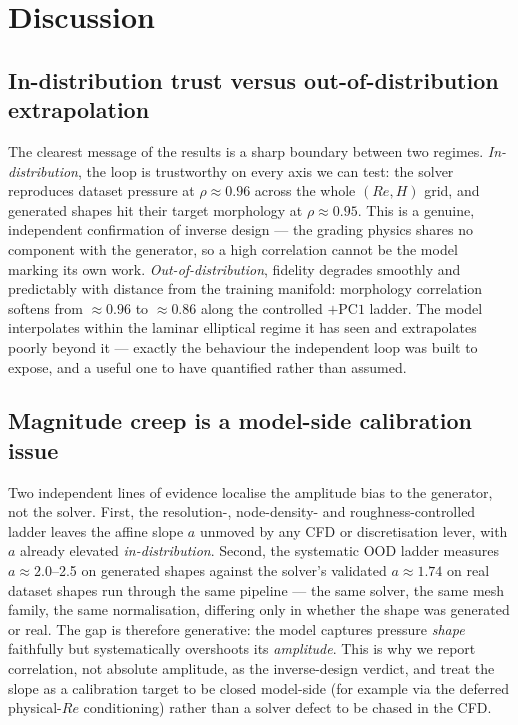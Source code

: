 \section{Discussion}

\subsection{In-distribution trust versus out-of-distribution extrapolation}

The clearest message of the results is a sharp boundary between two regimes. \emph{In-distribution},
the loop is trustworthy on every axis we can test: the solver reproduces dataset pressure at
$\rho \approx 0.96$ across the whole $(Re, H)$ grid, and generated shapes hit their target morphology
at $\rho \approx 0.95$. This is a genuine, independent confirmation of inverse design --- the grading
physics shares no component with the generator, so a high correlation cannot be the model marking its
own work. \emph{Out-of-distribution}, fidelity degrades smoothly and predictably with distance from
the training manifold: morphology correlation softens from $\approx 0.96$ to $\approx 0.86$ along the
controlled $+\mathrm{PC1}$ ladder. The model interpolates within the laminar elliptical regime it has
seen and extrapolates poorly beyond it --- exactly the behaviour the independent loop was built to
expose, and a useful one to have quantified rather than assumed.

\subsection{Magnitude creep is a model-side calibration issue}

Two independent lines of evidence localise the amplitude bias to the generator, not the solver. First,
the resolution-, node-density- and roughness-controlled ladder leaves the affine slope $a$ unmoved by
any CFD or discretisation lever, with $a$ already elevated \emph{in-distribution}. Second, the
systematic OOD ladder measures $a \approx 2.0$--2.5 on generated shapes against the solver's validated
$a \approx 1.74$ on real dataset shapes run through the same pipeline --- the same solver, the same
mesh family, the same normalisation, differing only in whether the shape was generated or real. The
gap is therefore generative: the model captures pressure \emph{shape} faithfully but systematically
overshoots its \emph{amplitude}. This is why we report correlation, not absolute amplitude, as the
inverse-design verdict, and treat the slope as a calibration target to be closed model-side (for
example via the deferred physical-$Re$ conditioning) rather than a solver defect to be chased in the
CFD.

